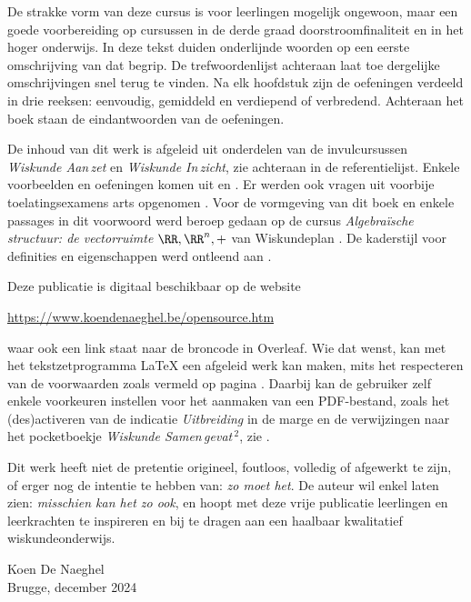 \documentclass{ximera}
\begin{document}
De strakke vorm van deze cursus is voor leerlingen mogelijk ongewoon, maar een goede voorbereiding op cursussen in de derde graad doorstroomfinaliteit en in het hoger onderwijs. In deze tekst duiden onderlijnde woorden op een eerste omschrijving van dat begrip. De trefwoordenlijst achteraan laat toe dergelijke omschrijvingen snel terug te vinden. Na elk hoofdstuk zijn de oefeningen verdeeld in drie reeksen: eenvoudig, gemiddeld en verdiepend of verbredend. Achteraan het boek staan de eindantwoorden van de oefeningen.

De inhoud van dit werk is afgeleid uit onderdelen van de invulcursussen {\em Wiskunde Aan\,zet} en {\em Wiskunde In\,zicht}, zie \cite{waz,wiz} achteraan in de referentielijst. Enkele voorbeelden en oefeningen komen uit \cite{TAOPS-intalg} en \cite{Dhont}. Er werden ook vragen uit voorbije toelatingsexamens arts opgenomen \cite{toelatingsexamens}. Voor de vormgeving van dit boek en enkele passages in dit voorwoord werd beroep gedaan op de cursus {\em Algebra\"ische structuur: de vectorruimte $\RR,\RR^n,+$} van Wiskundeplan \cite{Wiskundeplan:cursus}. De kaderstijl voor definities en eigenschappen werd ontleend aan \cite{Kuijpers}. 

Deze publicatie is digitaal beschikbaar op de website 
\begin{center}
\url{https://www.koendenaeghel.be/opensource.htm}
\end{center}
waar ook een link staat naar de broncode in Overleaf. Wie dat wenst, kan met het tekstzetprogramma \LaTeX{} een afgeleid werk kan maken, mits het respecteren van de voorwaarden zoals vermeld op pagina \pageref{rechten}.
Daarbij kan de gebruiker zelf enkele voorkeuren instellen voor het aanmaken van een PDF-bestand, zoals het (des)activeren van de indicatie \textit{Uitbreiding} in de marge en de verwijzingen naar het pocketboekje {\em Wiskunde Samen\,gevat\,${}^{2}$}, zie \cite{wsg}. 

Dit werk heeft niet de pretentie origineel, foutloos, volledig of afgewerkt te zijn, of erger nog de intentie te hebben van: {\em zo moet het}. De auteur wil enkel laten zien: {\em misschien kan het zo ook}, en hoopt met deze vrije publicatie leerlingen en leerkrachten te inspireren en bij te dragen aan een haalbaar kwalitatief wiskundeonderwijs.

\vfill{
\begin{flushright}
Koen De Naeghel \\
Brugge, december 2024
\end{flushright}
}
\end{document}
